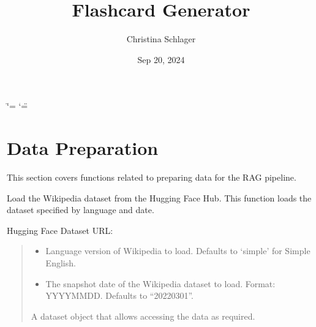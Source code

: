 \documentclass[letterpaper,10pt,english,openany,oneside]{sphinxmanual}
\title{Flashcard Generator}
\date{Sep 20, 2024}
\author{Christina Schlager}
\begin{document}
\ifdefined\shorthandoff
  \ifnum\catcode`\=\string=\active\shorthandoff{=}\fi
  \ifnum\catcode`\"=\active{}\fi
\fi

\pagestyle{empty}
\sphinxmaketitle
\pagestyle{plain}
\sphinxtableofcontents
\pagestyle{normal}
\label{\detokenize{index::doc}}


\sphinxstepscope


\chapter{Data Preparation}
\label{\detokenize{data_preparation:data-preparation}}\label{\detokenize{data_preparation::doc}}
\sphinxAtStartPar
This section covers functions related to preparing data for the RAG pipeline.
\label{\detokenize{data_preparation:module-tools.pipeline}}

\begin{fulllineitems}
\label{\detokenize{data_preparation:tools.pipeline.load_wikipedia_dataset}}
\pysigstartsignatures
{}
\pysigstopsignatures
\sphinxAtStartPar
Load the Wikipedia dataset from the Hugging Face Hub. This function loads the dataset
specified by language and date.

\sphinxAtStartPar
Hugging Face Dataset URL: 
\begin{quote}\begin{description}
\begin{itemize}
\item {} 
\sphinxAtStartPar
{} \textendash{} Language version of Wikipedia to load. Defaults to ‘simple’ for Simple English.

\item {} 
\sphinxAtStartPar
{} \textendash{} The snapshot date of the Wikipedia dataset to load. Format: YYYYMMDD. Defaults to “20220301”.

\end{itemize}

\sphinxAtStartPar
A dataset object that allows accessing the data as required.

\end{description}\end{quote}

\end{fulllineitems}
\end{document}
